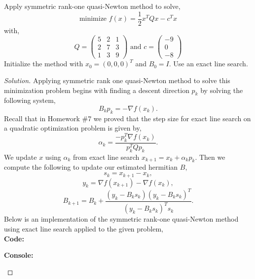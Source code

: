 \documentclass[12pt]{article}
\makeatletter
\theoremstyle{homework}
\newenvironment{exercise}[1]
{\def\@currentlabel{#1}\exercisecore}
{\endexercisecore}
\makeatother
\begin{document}
\begin{exercise}{3.1} Apply symmetric rank-one quasi-Newton method to solve, 
  \begin{equation*}
    \text{minimize } f(x) = \frac{1}{2}x^TQx - c^Tx
  \end{equation*}
  with, 
  \begin{equation*}
    Q = \begin{pmatrix}
      5 & 2 & 1 \\
      2 & 7 & 3 \\
      1 & 3 & 9 
    \end{pmatrix}
    \text{ and }
    c = 
    \begin{pmatrix}
      -9\\
      0\\
      -8
    \end{pmatrix}
  \end{equation*}
  Initialize the method with $x_0 = (0, 0, 0)^T$ and $B_0 = I$. Use an exact line search. 
  \begin{proof}[Solution] 
    Applying symmetric rank one quasi-Newton method to solve this minimization problem begins with finding 
    a descent direction $p_k$ by solving the following system, 
    \begin{equation*}
      B_kp_k = - \nabla f(x_k).
    \end{equation*}
    Recall that in Homework \#7 we proved that the step size for exact line search on 
    a quadratic optimization problem is given by, 
    \begin{equation*}
      \alpha_k = \frac{-p_k^T \nabla f(x_k)}{p_k^TQp_k}.
    \end{equation*}
    We update $x$ using $\alpha_k$ from exact line search $x_{k + 1} = x_k + \alpha_k p_k$.
    Then we compute the following to update our estimated hermitian $B$,
    \begin{equation*}
      s_k = x_{k + 1} - x_k,
    \end{equation*}
    \begin{equation*}
      y_k = \nabla f(x_{k + 1}) - \nabla f(x_k),
    \end{equation*}
    \begin{equation*}
      B_{k + 1} = B_k + \frac{(y_k - B_ks_k)(y_k - B_ks_k)^T}{(y_k - B_ks_k)^Ts_k}.
    \end{equation*}
    Below is an implementation of the symmetric rank-one quasi-Newton method using exact line search applied to the given problem,\\ 
    \textbf{Code:}
    \begin{center}
      
    \end{center}
    
    \textbf{Console:}
    \begin{center}
      
    \end{center}

  \end{proof}
\end{exercise}
\vspace{.5in}
\end{document}
